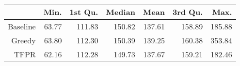 \begin{table}[ht]
\centering
\begin{tabular}{rrrrrrr}
  \hline
 & Min. & 1st Qu. & Median & Mean & 3rd Qu. & Max. \\ 
  \hline
Baseline & 63.77 & 111.83 & 150.82 & 137.61 & 158.89 & 185.88 \\ 
  Greedy & 63.80 & 112.30 & 150.39 & 139.25 & 160.38 & 353.84 \\ 
  TFPR & 62.16 & 112.28 & 149.73 & 137.67 & 159.21 & 182.46 \\ 
   \hline
\end{tabular}
\end{table}
